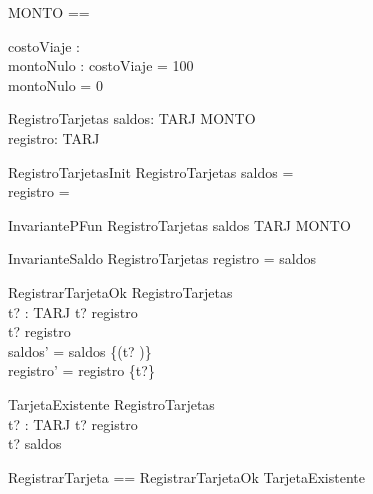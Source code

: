 \begin{zed}
[TARJ]
\end{zed}

\begin{zed}
MONTO == \nat 
\end{zed}

\begin{axdef}
costoViaje : \nat \\
montoNulo : \nat
\where
costoViaje = 100 \\
montoNulo = 0
\end{axdef}

\begin{schema}{RegistroTarjetas}
    saldos: TARJ \rel MONTO \\
    registro: \power TARJ
\end{schema}

\begin{schema}{RegistroTarjetasInit}
    RegistroTarjetas
\where
    saldos = \emptyset \\
    registro = \emptyset
\end{schema}

\begin{schema}{InvariantePFun}
    RegistroTarjetas
\where
    saldos \in TARJ \pfun MONTO
\end{schema}

\begin{schema}{InvarianteSaldo}
    RegistroTarjetas
\where
    registro = \dom saldos
\end{schema}

\begin{schema}{RegistrarTarjetaOk}
    \Delta RegistroTarjetas \\
    t? : TARJ 
\where
    t? \notin registro \\ 
    t? \notin \dom registro \\
    saldos' = saldos \cup \{(t? )\} \\
    registro' = registro \cup \{t?\} 
\end{schema}

\begin{schema}{TarjetaExistente}
    \Xi RegistroTarjetas \\
    t? : TARJ 
\where
    t? \in registro \\
    t? \in \dom saldos 
\end{schema}

\begin{zed}
    RegistrarTarjeta == RegistrarTarjetaOk \lor TarjetaExistente \\
\end{zed}


